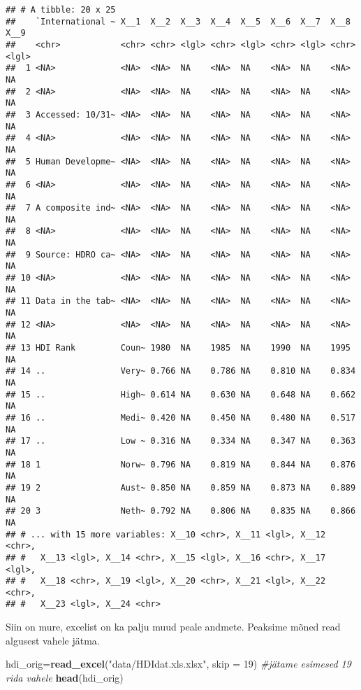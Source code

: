 \documentclass[]{article}
\newenvironment{Shaded}{\begin{snugshade}}{\end{snugshade}}
\newcommand{\KeywordTok}[1]{\textcolor[rgb]{0.13,0.29,0.53}{\textbf{#1}}}
\newcommand{\DataTypeTok}[1]{\textcolor[rgb]{0.13,0.29,0.53}{#1}}
\newcommand{\DecValTok}[1]{\textcolor[rgb]{0.00,0.00,0.81}{#1}}
\newcommand{\StringTok}[1]{\textcolor[rgb]{0.31,0.60,0.02}{#1}}
\newcommand{\CommentTok}[1]{\textcolor[rgb]{0.56,0.35,0.01}{\textit{#1}}}
\newcommand{\NormalTok}[1]{#1}
\begin{document}
\begin{verbatim}
## # A tibble: 20 x 25
##    `International ~ X__1  X__2  X__3  X__4  X__5  X__6  X__7  X__8  X__9 
##    <chr>            <chr> <chr> <lgl> <chr> <lgl> <chr> <lgl> <chr> <lgl>
##  1 <NA>             <NA>  <NA>  NA    <NA>  NA    <NA>  NA    <NA>  NA   
##  2 <NA>             <NA>  <NA>  NA    <NA>  NA    <NA>  NA    <NA>  NA   
##  3 Accessed: 10/31~ <NA>  <NA>  NA    <NA>  NA    <NA>  NA    <NA>  NA   
##  4 <NA>             <NA>  <NA>  NA    <NA>  NA    <NA>  NA    <NA>  NA   
##  5 Human Developme~ <NA>  <NA>  NA    <NA>  NA    <NA>  NA    <NA>  NA   
##  6 <NA>             <NA>  <NA>  NA    <NA>  NA    <NA>  NA    <NA>  NA   
##  7 A composite ind~ <NA>  <NA>  NA    <NA>  NA    <NA>  NA    <NA>  NA   
##  8 <NA>             <NA>  <NA>  NA    <NA>  NA    <NA>  NA    <NA>  NA   
##  9 Source: HDRO ca~ <NA>  <NA>  NA    <NA>  NA    <NA>  NA    <NA>  NA   
## 10 <NA>             <NA>  <NA>  NA    <NA>  NA    <NA>  NA    <NA>  NA   
## 11 Data in the tab~ <NA>  <NA>  NA    <NA>  NA    <NA>  NA    <NA>  NA   
## 12 <NA>             <NA>  <NA>  NA    <NA>  NA    <NA>  NA    <NA>  NA   
## 13 HDI Rank         Coun~ 1980  NA    1985  NA    1990  NA    1995  NA   
## 14 ..               Very~ 0.766 NA    0.786 NA    0.810 NA    0.834 NA   
## 15 ..               High~ 0.614 NA    0.630 NA    0.648 NA    0.662 NA   
## 16 ..               Medi~ 0.420 NA    0.450 NA    0.480 NA    0.517 NA   
## 17 ..               Low ~ 0.316 NA    0.334 NA    0.347 NA    0.363 NA   
## 18 1                Norw~ 0.796 NA    0.819 NA    0.844 NA    0.876 NA   
## 19 2                Aust~ 0.850 NA    0.859 NA    0.873 NA    0.889 NA   
## 20 3                Neth~ 0.792 NA    0.806 NA    0.835 NA    0.866 NA   
## # ... with 15 more variables: X__10 <chr>, X__11 <lgl>, X__12 <chr>,
## #   X__13 <lgl>, X__14 <chr>, X__15 <lgl>, X__16 <chr>, X__17 <lgl>,
## #   X__18 <chr>, X__19 <lgl>, X__20 <chr>, X__21 <lgl>, X__22 <chr>,
## #   X__23 <lgl>, X__24 <chr>
\end{verbatim}

Siin on mure, excelist on ka palju muud peale andmete. Peaksime mõned
read algusest vahele jätma.

\begin{Shaded}
\begin{Highlighting}[]
\NormalTok{hdi_orig=}\KeywordTok{read_excel}\NormalTok{(}\StringTok{"data/HDIdat.xls.xlsx"}\NormalTok{, }\DataTypeTok{skip =} \DecValTok{19}\NormalTok{) }\CommentTok{#jätame esimesed 19 rida vahele}
\KeywordTok{head}\NormalTok{(hdi_orig)}
\end{Highlighting}
\end{Shaded}
\end{document}
